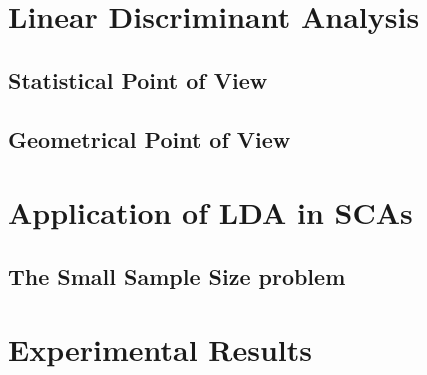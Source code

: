 
\section{Linear Discriminant Analysis}
\subsection{Statistical Point of View}
\subsection{Geometrical Point of View}


\section{Application of LDA in SCAs}
\subsection{The Small Sample Size problem}





\section{Experimental Results}\label{sec:experiments}

